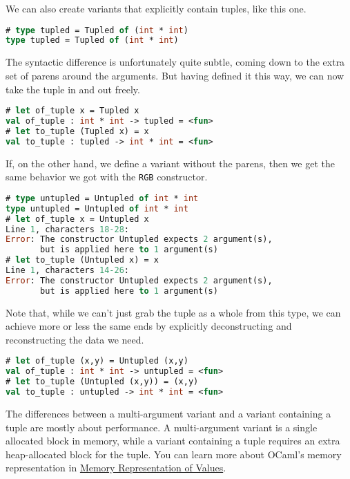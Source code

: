 We can also create variants that explicitly contain tuples, like this
one.

\begin{lstlisting}[language=Caml]
# type tupled = Tupled of (int * int)
type tupled = Tupled of (int * int)
\end{lstlisting}

The syntactic difference is unfortunately quite subtle, coming down to
the extra set of parens around the arguments. But having defined it this
way, we can now take the tuple in and out freely.

\begin{lstlisting}[language=Caml]
# let of_tuple x = Tupled x
val of_tuple : int * int -> tupled = <fun>
# let to_tuple (Tupled x) = x
val to_tuple : tupled -> int * int = <fun>
\end{lstlisting}

If, on the other hand, we define a variant without the parens, then we
get the same behavior we got with the \passthrough{\lstinline!RGB!}
constructor.

\begin{lstlisting}[language=Caml]
# type untupled = Untupled of int * int
type untupled = Untupled of int * int
# let of_tuple x = Untupled x
Line 1, characters 18-28:
Error: The constructor Untupled expects 2 argument(s),
       but is applied here to 1 argument(s)
# let to_tuple (Untupled x) = x
Line 1, characters 14-26:
Error: The constructor Untupled expects 2 argument(s),
       but is applied here to 1 argument(s)
\end{lstlisting}

Note that, while we can't just grab the tuple as a whole from this type,
we can achieve more or less the same ends by explicitly deconstructing
and reconstructing the data we need.

\begin{lstlisting}[language=Caml]
# let of_tuple (x,y) = Untupled (x,y)
val of_tuple : int * int -> untupled = <fun>
# let to_tuple (Untupled (x,y)) = (x,y)
val to_tuple : untupled -> int * int = <fun>
\end{lstlisting}

The differences between a multi-argument variant and a variant
containing a tuple are mostly about performance. A multi-argument
variant is a single allocated block in memory, while a variant
containing a tuple requires an extra heap-allocated block for the tuple.
You can learn more about OCaml's memory representation in
\href{runtime-memory-layout.html}{Memory Representation of Values}.

